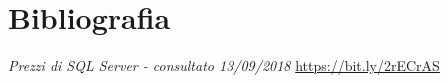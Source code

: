 

\cleardoublepage
\chapter{Bibliografia}

\begin{thebibliography}{99}
		\textit{Prezzi di SQL Server - consultato 13/09/2018}
		\url{https://bit.ly/2rECrAS}
\end{thebibliography}
